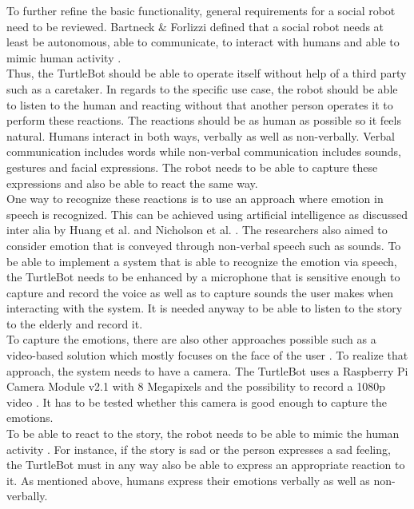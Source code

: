 \documentclass[plainarticle,zihtitle,english,final,hyperref,utf8]{zihpub}
\begin{document}
\bigskip
To further refine the basic functionality, general requirements for a social robot need to be reviewed.
Bartneck \& Forlizzi defined that a social robot needs at least be autonomous, able to communicate, to interact with humans and able to mimic human activity . \\
Thus, the TurtleBot should be able to operate itself without help of a third party such as a caretaker. In regards to the specific use case, the robot should be able to listen to the human and reacting without that another person operates it to perform these reactions. The reactions should be as human as possible so it feels natural. Humans interact in both ways, verbally as well as non-verbally. Verbal communication includes words while non-verbal communication includes sounds, gestures and facial expressions. The robot needs to be able to capture these expressions and also be able to react the same way. \\
\newline
One way to recognize these reactions is to use an approach where emotion in speech is recognized. This can be achieved using artificial intelligence as discussed inter alia by Huang et al.  and Nicholson et al. . The researchers also aimed to consider emotion that is conveyed through non-verbal speech such as sounds. To be able to implement a system that is able to recognize the emotion via speech, the TurtleBot needs to be enhanced by a microphone that is sensitive enough to capture and record the voice as well as to capture sounds the user makes when interacting with the system. It is needed anyway to be able to listen to the story to the elderly and record it. \\
\newline
To capture the emotions, there are also other approaches possible such as a video-based solution which mostly focuses on the face of the user . To realize that approach, the system needs to have a camera. The TurtleBot uses a Raspberry Pi Camera Module v2.1 \cite{tbspecificiations} with 8 Megapixels and the possibility to record a 1080p video \cite{raspbicam}. It has to be tested whether this camera is good enough to capture the emotions.\\
\newline
To be able to react to the story, the robot needs to be able to mimic the human activity . For instance, if the story is sad or the person expresses a sad feeling, the TurtleBot must in any way also be able to express an appropriate reaction to it. As mentioned above, humans express their emotions verbally as well as non-verbally. 
\end{document}
